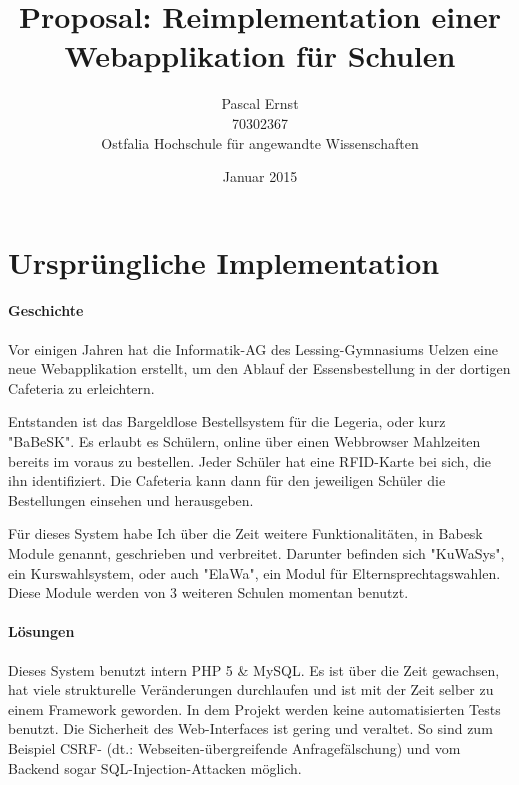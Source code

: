 \documentclass[a4paper,10pt]{scrartcl}
\begin{document}
\title{Proposal: Reimplementation einer Webapplikation für Schulen}
\author{Pascal Ernst\\
  70302367 \\
  Ostfalia Hochschule für angewandte Wissenschaften}
\date{Januar 2015}
\maketitle

\newpage

\section{Ursprüngliche Implementation}

  \paragraph{Geschichte}
    Vor einigen Jahren hat die Informatik-AG des Lessing-Gymnasiums Uelzen eine
    neue Webapplikation erstellt, um den Ablauf der Essensbestellung in der
    dortigen Cafeteria zu erleichtern.

    Entstanden ist das Bargeldlose Bestellsystem für die Legeria, oder kurz
    "BaBeSK".
    Es erlaubt es Schülern, online über einen Webbrowser Mahlzeiten bereits im
    voraus zu bestellen.
    Jeder Schüler hat eine RFID-Karte bei sich, die ihn identifiziert.
    Die Cafeteria kann dann für den jeweiligen Schüler die Bestellungen einsehen
    und herausgeben.

    Für dieses System habe Ich über die Zeit weitere Funktionalitäten, in Babesk
    Module genannt, geschrieben und verbreitet.
    Darunter befinden sich "KuWaSys", ein Kurswahlsystem, oder auch "ElaWa",
    ein Modul für Elternsprechtagswahlen.
    Diese Module werden von 3 weiteren Schulen momentan benutzt.

  \paragraph{Lösungen}
    Dieses System benutzt intern PHP 5 \& MySQL.
    Es ist über die Zeit gewachsen, hat viele strukturelle Veränderungen
    durchlaufen und ist mit der Zeit selber zu einem Framework geworden.
    In dem Projekt werden keine automatisierten Tests benutzt.
    Die Sicherheit des Web-Interfaces ist gering und veraltet.
    So sind zum Beispiel CSRF- (dt.: Webseiten-übergreifende
    Anfragefälschung) und vom Backend sogar SQL-Injection-Attacken möglich.
\end{document}

